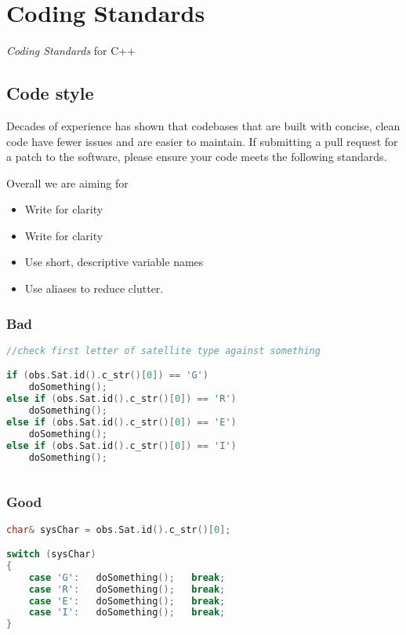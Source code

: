 \chapter{Coding Standards}
\label{ch:coding_standards}

\textit{Coding Standards} for C++

\section{Code style}
Decades of experience has shown that codebases that are built with concise, clean code have fewer issues and are easier to maintain. If submitting a pull request for a patch to the software, please ensure your code meets the following standards.

Overall we are aiming for
\begin{itemize}
	\item  Write for clarity
	\item  Write for clarity
	\item  Use short, descriptive variable names
	\item  Use aliases to reduce clutter.
\end{itemize}

\subsection{Bad}
\begin{lstlisting}[language=C++]
//check first letter of satellite type against something

if (obs.Sat.id().c_str()[0]) == 'G') 
    doSomething(); 
else if (obs.Sat.id().c_str()[0]) == 'R')
    doSomething();
else if (obs.Sat.id().c_str()[0]) == 'E')
    doSomething();
else if (obs.Sat.id().c_str()[0]) == 'I')
    doSomething();
    
\end{lstlisting}

\subsection{Good}

\begin{lstlisting}[language=c++]
char& sysChar = obs.Sat.id().c_str()[0];

switch (sysChar)
{
    case 'G':   doSomething();   break;
    case 'R':   doSomething();   break;
    case 'E':   doSomething();   break;
    case 'I':   doSomething();   break;
}
\end{lstlisting}


